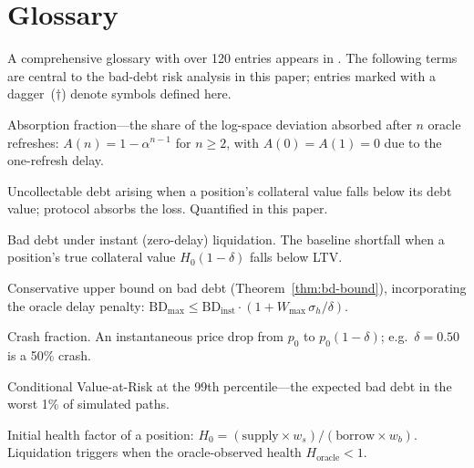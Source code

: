 \documentclass[10pt,a4paper,twocolumn]{article}
\begin{document}
\ifbundle\else
\section*{Glossary}
\label{sim:glossary}

\noindent A comprehensive glossary with over 120 entries appears in \cite{ref}. The following terms are central to the bad-debt risk analysis in this paper; entries marked with a dagger~($\dagger$) denote symbols defined here.

\begin{description}[style=nextline, font=\normalfont\bfseries, leftmargin=1.5em]

\item[$A(n)$\,$\dagger$] Absorption fraction---the share of the log-space deviation absorbed after $n$ oracle refreshes: $A(n) = 1 - \alpha^{n-1}$ for $n \geq 2$, with $A(0) = A(1) = 0$ due to the one-refresh delay.

\item[Bad Debt] Uncollectable debt arising when a position's collateral value falls below its debt value; protocol absorbs the loss. Quantified in this paper.

\item[$\text{BD}_{\text{inst}}$\,$\dagger$] Bad debt under instant (zero-delay) liquidation. The baseline shortfall when a position's true collateral value $H_0(1{-}\delta)$ falls below LTV.

\item[$\text{BD}_{\max}$\,$\dagger$] Conservative upper bound on bad debt (Theorem~\ref{thm:bd-bound}), incorporating the oracle delay penalty: $\text{BD}_{\max} \leq \text{BD}_{\text{inst}} \cdot (1 + W_{\max}\,\sigma_h / \delta)$.

\item[$\delta$\,$\dagger$] Crash fraction. An instantaneous price drop from $p_0$ to $p_0(1{-}\delta)$; e.g.\ $\delta = 0.50$ is a 50\% crash.

\item[$\text{CVaR}(99\%)$\,$\dagger$] Conditional Value-at-Risk at the 99th percentile---the expected bad debt in the worst 1\% of simulated paths.

\item[$H_0$\,$\dagger$] Initial health factor of a position: $H_0 = (\text{supply} \times w_s) / (\text{borrow} \times w_b)$. Liquidation triggers when the oracle-observed health $H_{\text{oracle}} < 1$.


\end{description}
\end{document}
